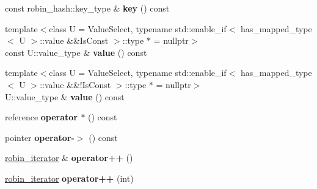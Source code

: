 \begin{DoxyCompactItemize}
\item 
\mbox{\label{classtsl_1_1detail__robin__hash_1_1robin__hash_1_1robin__iterator_a8258d1ca5b1a039991ed591208a8e1cc}} 
const robin\+\_\+hash\+::key\+\_\+type \& {\bfseries key} () const
\item 
\mbox{\label{classtsl_1_1detail__robin__hash_1_1robin__hash_1_1robin__iterator_a84a31899b7ab0c15d636ae42ee14b41f}} 
{\footnotesize template$<$class U  = Value\+Select, typename std\+::enable\+\_\+if$<$ has\+\_\+mapped\+\_\+type$<$ U $>$\+::value \&\&\+Is\+Const $>$\+::type $\ast$  = nullptr$>$ }\\const U\+::value\+\_\+type \& {\bfseries value} () const
\item 
\mbox{\label{classtsl_1_1detail__robin__hash_1_1robin__hash_1_1robin__iterator_a5cd64c5a549b4d96d47ff6f9c201bcfd}} 
{\footnotesize template$<$class U  = Value\+Select, typename std\+::enable\+\_\+if$<$ has\+\_\+mapped\+\_\+type$<$ U $>$\+::value \&\&!\+Is\+Const $>$\+::type $\ast$  = nullptr$>$ }\\U\+::value\+\_\+type \& {\bfseries value} () const
\item 
\mbox{\label{classtsl_1_1detail__robin__hash_1_1robin__hash_1_1robin__iterator_a4838d9fbd23d5082a22f7a093a1a9dab}} 
reference {\bfseries operator $\ast$} () const
\item 
\mbox{\label{classtsl_1_1detail__robin__hash_1_1robin__hash_1_1robin__iterator_aee4b23b321f08602ebc67d881f147a6c}} 
pointer {\bfseries operator-\/$>$} () const
\item 
\mbox{\label{classtsl_1_1detail__robin__hash_1_1robin__hash_1_1robin__iterator_acd5ad8d7a40b9c0121c649ec272930a7}} 
\mbox{\hyperlink{classtsl_1_1detail__robin__hash_1_1robin__hash_1_1robin__iterator}{robin\+\_\+iterator}} \& {\bfseries operator++} ()
\item 
\mbox{\label{classtsl_1_1detail__robin__hash_1_1robin__hash_1_1robin__iterator_a3b75d06ce894ce951b8469fc72f534e2}} 
\mbox{\hyperlink{classtsl_1_1detail__robin__hash_1_1robin__hash_1_1robin__iterator}{robin\+\_\+iterator}} {\bfseries operator++} (int)
\end{DoxyCompactItemize}

